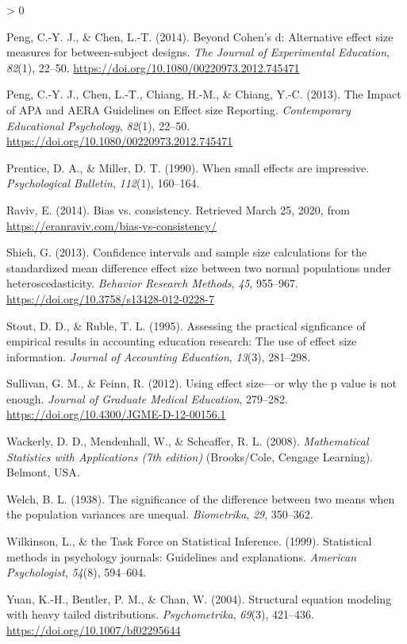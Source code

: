\documentclass[
  english,
  man,floatsintext]{apa6}
\newlength{\cslhangindent}
\newenvironment{CSLReferences}[2] %
 {%
  \setlength{\parindent}{0pt}
  \ifodd #1 \everypar{\setlength{\hangindent}{\cslhangindent}}\ignorespaces\fi
  \ifnum #2 > 0
  \setlength{\parskip}{#2\baselineskip}
  \fi
 }%
 {}
\begin{document}
\begin{CSLReferences}{1}{0}
\leavevmode\hypertarget{ref-Peng_and_Chen_2014}{}%
Peng, C.-Y. J., \& Chen, L.-T. (2014). Beyond {C}ohen's d: Alternative effect size measures for between-subject designs. \emph{The {J}ournal of {E}xperimental {E}ducation}, \emph{82}(1), 22--50. \url{https://doi.org/10.1080/00220973.2012.745471}

\leavevmode\hypertarget{ref-Peng_et_al_2013}{}%
Peng, C.-Y. J., Chen, L.-T., Chiang, H.-M., \& Chiang, Y.-C. (2013). {T}he {I}mpact of {APA} and {AERA} {G}uidelines on {E}ffect size {R}eporting. \emph{{C}ontemporary {E}ducational {P}sychology}, \emph{82}(1), 22--50. \url{https://doi.org/10.1080/00220973.2012.745471}

\leavevmode\hypertarget{ref-Prentice_Miller_1992}{}%
Prentice, D. A., \& Miller, D. T. (1990). When small effects are impressive. \emph{{P}sychological {B}ulletin}, \emph{112}(1), 160--164.

\leavevmode\hypertarget{ref-Raviv}{}%
Raviv, E. (2014). Bias vs. consistency. Retrieved March 25, 2020, from \url{https://eranraviv.com/bias-vs-consistency/}

\leavevmode\hypertarget{ref-Shieh_2013}{}%
Shieh, G. (2013). Confidence intervals and sample size calculations for the standardized mean difference effect size between two normal populations under heteroscedasticity. \emph{{B}ehavior {R}esearch {M}ethods}, \emph{45}, 955--967. \url{https://doi.org/10.3758/s13428-012-0228-7}

\leavevmode\hypertarget{ref-Stout_Ruble_1995}{}%
Stout, D. D., \& Ruble, T. L. (1995). Assessing the practical signficance of empirical results in accounting education research: The use of effect size information. \emph{{J}ournal of {A}ccounting {E}ducation}, \emph{13}(3), 281--298.

\leavevmode\hypertarget{ref-Sullivan_Feinn_2012}{}%
Sullivan, G. M., \& Feinn, R. (2012). Using effect size---or why the p value is not enough. \emph{{J}ournal of {G}raduate {M}edical {E}ducation}, 279--282. \url{https://doi.org/10.4300/JGME-D-12-00156.1}

\leavevmode\hypertarget{ref-Wackerly_et_al_2008}{}%
Wackerly, D. D., Mendenhall, W., \& Scheaffer, R. L. (2008). \emph{Mathematical {S}tatistics with {A}pplications (7th edition)} ({B}rooks/{C}ole, {C}engage {L}earning). Belmont, {USA}.

\leavevmode\hypertarget{ref-Welch_1938}{}%
Welch, B. L. (1938). The significance of the difference between two means when the population variances are unequal. \emph{{B}iometrika}, \emph{29}, 350--362.

\leavevmode\hypertarget{ref-Wilkinson_1999}{}%
Wilkinson, L., \& the Task Force on Statistical Inference. (1999). Statistical methods in psychology journals: Guidelines and explanations. \emph{American Psychologist}, \emph{54}(8), 594--604.

\leavevmode\hypertarget{ref-Yuan_et_al_2004}{}%
Yuan, K.-H., Bentler, P. M., \& Chan, W. (2004). Structural equation modeling with heavy tailed distributions. \emph{Psychometrika}, \emph{69}(3), 421--436. \url{https://doi.org/10.1007/bf02295644}

\end{CSLReferences}
\end{document}
